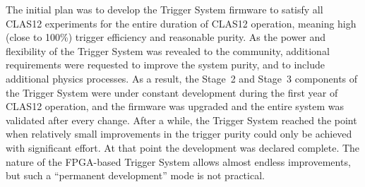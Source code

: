 The initial plan was to develop the Trigger System firmware to satisfy all CLAS12 experiments for the entire
duration of CLAS12 operation, meaning high (close to 100\%) trigger efficiency and reasonable purity. As the
power and flexibility of the Trigger System was revealed to the community, additional requirements were
requested to improve the system purity, and to include additional physics processes. As a result, the Stage~2
and Stage~3 components of the Trigger System were under constant development during the first year of
CLAS12 operation, and the firmware was upgraded and the entire system was validated after every change.
After a while, the Trigger System reached the point when relatively small improvements in the trigger purity
could only be achieved with significant effort. At that point the development was declared complete. The nature
of the FPGA-based Trigger System allows almost endless improvements, but such a ``permanent development''
mode is not practical.
